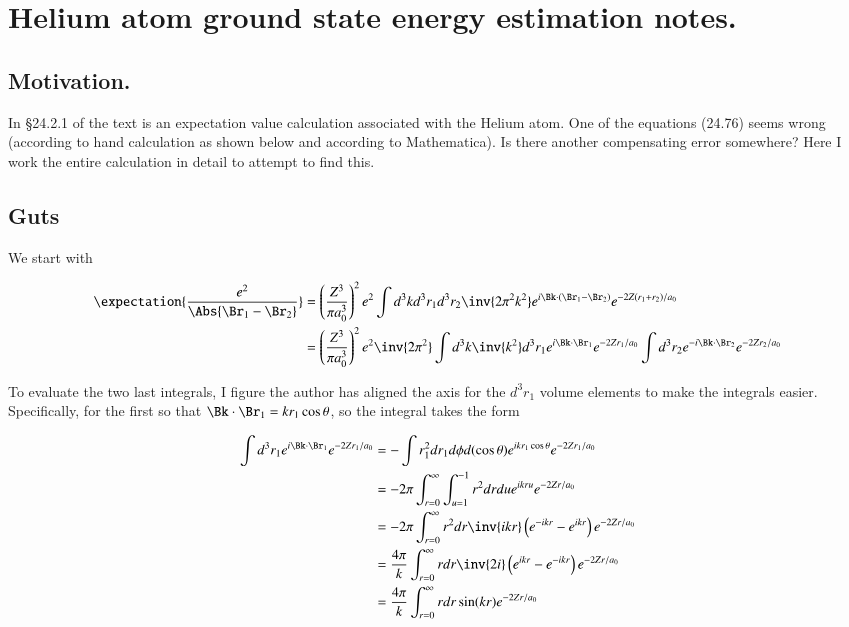%
%

\chapter{Helium atom ground state energy estimation notes.}
\label{chap:variationalHelium}
{}
\date{Sept 29, 2011}

\beginArtNoToc

\section{Motivation.}

In \S 24.2.1 of the text \cite{desai2009quantum} is an expectation value calculation associated with the Helium atom.  One of the equations (24.76) seems wrong (according to hand calculation as shown below and according to Mathematica).  Is there another compensating error somewhere?  Here I work the entire calculation in detail to attempt to find this.

\section{Guts}

We start with

\begin{align*}
\expectation{\frac{e^2}{\Abs{\Br_1 - \Br_2}}}
&=
\left( \frac{Z^3}{\pi a_0^3}\right)^2 e^2
\int d^3 k d^3 r_1 d^3 r_2 \inv{2 \pi^2 k^2} e^{i \Bk \cdot (\Br_1 - \Br_2) } e^{ -2 Z (r_1 + r_2)/a_0} \\
&= 
\left( \frac{Z^3}{\pi a_0^3}\right)^2 e^2
\inv{2 \pi^2} 
\int d^3 k \inv{k^2}
d^3 r_1 
e^{i \Bk \cdot \Br_1 } e^{ -2 Z r_1 /a_0} 
\int 
d^3 r_2 
e^{-i \Bk \cdot \Br_2 } e^{ -2 Z r_2/a_0} \\
\end{align*}

To evaluate the two last integrals, I figure the author has aligned the axis for the $d^3 r_1$ volume elements to make the integrals easier.  Specifically, for the first so that $\Bk \cdot \Br_1 = k r_1 \cos\theta$, so the integral takes the form

\begin{align*}
\int 
d^3 r_1 
e^{i \Bk \cdot \Br_1 } e^{ -2 Z r_1 /a_0} 
&=
-\int 
r_1^2 d r_1 d\phi d(\cos\theta)
e^{i k r_1 \cos\theta } e^{ -2 Z r_1 /a_0} \\
&=
- 2 \pi \int_{r=0}^\infty \int_{u=1}^{-1}
r^2 dr du
e^{i k r u } e^{ -2 Z r /a_0} \\
&=
- 2 \pi \int_{r=0}^\infty 
r^2 dr 
\inv{i k r} \left( e^{-i k r } - e^{i k r} \right) e^{ -2 Z r /a_0} \\
&=
\frac{4 \pi}{k } \int_{r=0}^\infty 
r dr 
\inv{2i} \left( e^{i k r } - e^{-i k r} \right) e^{ -2 Z r /a_0} \\
&=
\frac{4 \pi}{k } \int_{r=0}^\infty r dr \sin(k r) e^{ -2 Z r /a_0} \\
\end{align*}

